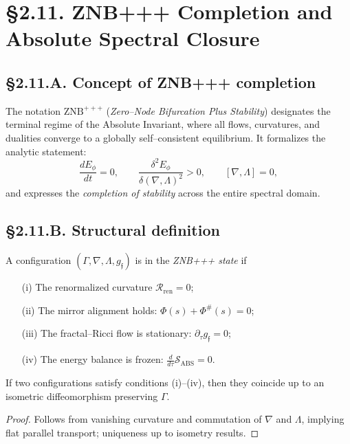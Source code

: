 \section{§2.11. ZNB+++ Completion and Absolute Spectral Closure}
\label{sec:2.11-znb}

\subsection*{§2.11.A. Concept of ZNB+++ completion}

The notation $\mathrm{ZNB}^{+++}$ (\emph{Zero–Node Bifurcation Plus Stability})
designates the terminal regime of the Absolute Invariant,
where all flows, curvatures, and dualities converge to a
globally self–consistent equilibrium.
It formalizes the analytic statement:
\[
\frac{dE_\phi}{dt}=0,\qquad
\frac{\delta^2E_\phi}{\delta(\nabla,\Lambda)^2}>0,
\qquad
[\nabla,\Lambda]=0,
\]
and expresses the \emph{completion of stability} across the entire spectral domain.

\subsection*{§2.11.B. Structural definition}

\begin{definition}
A configuration $(\Gamma,\nabla,\Lambda,g_\mathfrak{f})$ is in the
\emph{ZNB+++ state} if
\begin{enumerate}
  \item[(i)] The renormalized curvature $\mathcal{R}_{\mathrm{ren}}=0$;
  \item[(ii)] The mirror alignment holds: $\Phi(s)+\Phi^\#(s)=0$;
  \item[(iii)] The fractal–Ricci flow is stationary:
        $\partial_\tau g_\mathfrak{f}=0$;
  \item[(iv)] The energy balance is frozen:
        $\frac{d}{d\tau}\mathcal{S}_{\mathrm{ABS}}=0$.
\end{enumerate}
\]
\end{definition}

\begin{lemma}
If two configurations satisfy conditions (i)–(iv), then they coincide
up to an isometric diffeomorphism preserving $\Gamma$.
\end{lemma}

\begin{proof}
Follows from vanishing curvature and commutation of $\nabla$ and $\Lambda$,
implying flat parallel transport; uniqueness up to isometry results.
\end{proof}

